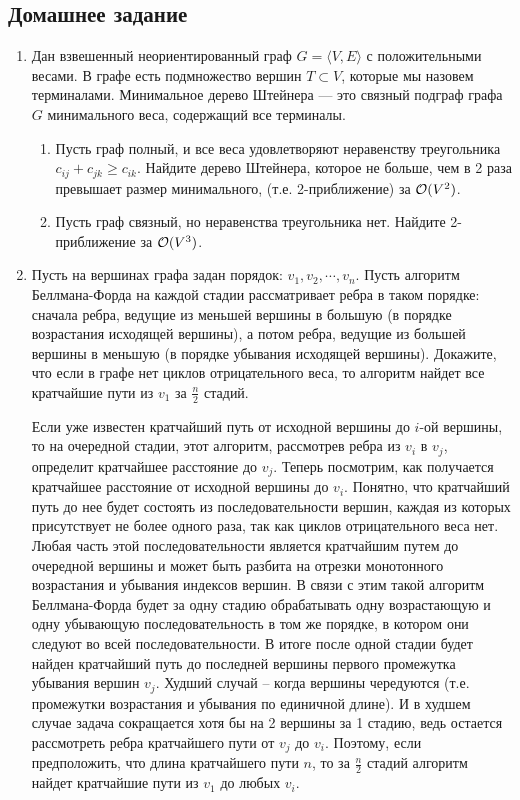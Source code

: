\subsection{Домашнее задание}
\begin{enumerate}
  \item
    Дан взвешенный неориентированный граф $G = \langle V, E \rangle$ с положительными весами.
    В графе есть подмножество вершин $T \subset V$, которые мы назовем терминалами.
    Минимальное дерево Штейнера --- это связный подграф графа $G$ минимального веса, содержащий
    все терминалы.
    \begin{enumerate}
      \item
        Пусть граф полный, и все веса удовлетворяют неравенству треугольника $c_{ij} + c_{jk} \geq c_{ik}$.
        Найдите дерево Штейнера, которое не больше, чем в 2 раза превышает размер минимального,
        (т.е. 2-приближение) за $\mathcal{O}(V^2)$.
      \item
        Пусть граф связный, но неравенства треугольника нет. Найдите 2-приближение за $\mathcal{O}(V^3)$.
    \end{enumerate}

  \item
    Пусть на вершинах графа задан порядок: $v_1, v_2, \cdots, v_n$.
    Пусть алгоритм Беллмана-Форда на каждой стадии рассматривает
    ребра в таком порядке: сначала ребра, ведущие из меньшей вершины в
    большую (в порядке возрастания исходящей вершины), а потом ребра,
    ведущие из большей вершины в меньшую (в порядке убывания исходящей
    вершины). Докажите, что если в графе нет циклов отрицательного
    веса, то алгоритм найдет все кратчайшие пути из $v_1$ за $\frac{n}{2}$
    стадий.
    \begin{solution}
      Если уже известен кратчайший путь от исходной вершины до $i$-ой вершины, то на очередной стадии, этот алгоритм, рассмотрев ребра из $v_i$ в $v_j$, определит кратчайшее расстояние до $v_j$.
      Теперь посмотрим, как получается кратчайшее расстояние от исходной вершины до $v_i$. Понятно, что кратчайший путь до нее будет состоять из последовательности вершин, каждая из которых присутствует не более одного раза, так как циклов отрицательного веса нет. Любая часть этой последовательности является кратчайшим путем до очередной вершины и может быть разбита на отрезки монотонного возрастания и убывания индексов вершин. В связи с этим такой алгоритм Беллмана-Форда будет за одну стадию обрабатывать одну возрастающую и одну убывающую последовательность в том же порядке, в котором они следуют во всей последовательности. В итоге после одной стадии будет найден кратчайший путь до последней вершины первого промежутка убывания вершин $v_j$. Худший случай -- когда вершины чередуются (т.е. промежутки возрастания и убывания по единичной длине). И в худшем случае задача сокращается хотя бы на 2 вершины за 1 стадию, ведь остается рассмотреть ребра кратчайшего пути от $v_j$ до $v_i$. Поэтому, если предположить, что длина кратчайшего пути $n$, то за $\frac{n}{2}$ стадий алгоритм найдет кратчайшие пути из $v_1$ до любых $v_i$.
    \end{solution}


\end{enumerate}
